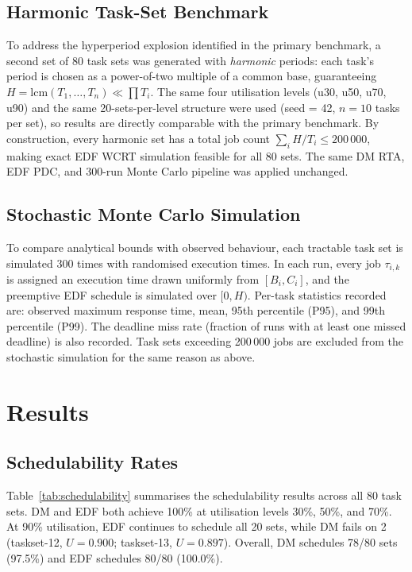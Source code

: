 \documentclass[a4paper,11pt]{article}
\begin{document}
\subsection{Harmonic Task-Set Benchmark}
\label{sec:harmonic_method}

To address the hyperperiod explosion identified in the primary benchmark, a second set of
80 task sets was generated with \emph{harmonic} periods: each task's period is chosen as
a power-of-two multiple of a common base, guaranteeing
$H = \mathrm{lcm}(T_1,\ldots,T_n) \ll \prod T_i$.
The same four utilisation levels (u30, u50, u70, u90) and the same 20-sets-per-level
structure were used (seed = 42, $n = 10$ tasks per set), so results are directly comparable
with the primary benchmark. By construction, every harmonic set has a total job count
$\sum_i H/T_i \leq 200\,000$, making exact EDF WCRT simulation feasible for all 80 sets.
The same DM RTA, EDF PDC, and 300-run Monte Carlo pipeline was applied unchanged.

\subsection{Stochastic Monte Carlo Simulation}
\label{sec:sim}

To compare analytical bounds with observed behaviour, each tractable task set is simulated
300 times with randomised execution times. In each run, every job $\tau_{i,k}$ is assigned
an execution time drawn uniformly from $[B_i, C_i]$, and the preemptive EDF schedule is
simulated over $[0, H)$. Per-task statistics recorded are: observed maximum response time,
mean, 95th percentile (P95), and 99th percentile (P99). The deadline miss rate (fraction of
runs with at least one missed deadline) is also recorded. Task sets exceeding 200\,000 jobs
are excluded from the stochastic simulation for the same reason as above.

\section{Results}
\label{sec:results}

\subsection{Schedulability Rates}

Table~\ref{tab:schedulability} summarises the schedulability results across all 80 task sets.
DM and EDF both achieve 100\% at utilisation levels 30\%, 50\%, and 70\%. At 90\% utilisation,
EDF continues to schedule all 20 sets, while DM fails on 2 (taskset-12, $U = 0.900$;
taskset-13, $U = 0.897$). Overall, DM schedules 78/80 sets (97.5\%) and EDF schedules 80/80
(100.0\%).
\end{document}
